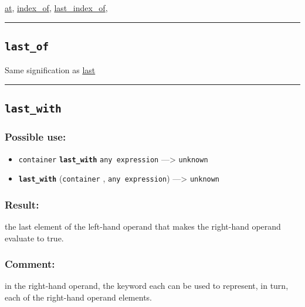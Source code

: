 \documentclass[]{book}
\providecommand{\tightlist}{%
  \setlength{\itemsep}{0pt}\setlength{\parskip}{0pt}}
\theoremstyle{definition}
\theoremstyle{definition}
\theoremstyle{definition}
\theoremstyle{remark}
\begin{document}
\href{OperatorsAA\#at}{at}, \href{OperatorsIM\#index_of}{index\_of},
\href{OperatorsIM\#last_index_of}{last\_index\_of},

\begin{center}\rule{0.5\linewidth}{\linethickness}\end{center}

\subsection{\texorpdfstring{\texttt{last\_of}}{last\_of}}\label{last_of}

Same signification as \href{OperatorsIM\#last}{last}

\begin{center}\rule{0.5\linewidth}{\linethickness}\end{center}

\subsection{\texorpdfstring{\texttt{last\_with}}{last\_with}}\label{last_with}

\subsubsection{Possible use:}\label{possible-use-318}

\begin{itemize}
\tightlist
\item
  \texttt{container} \textbf{\texttt{last\_with}}
  \texttt{any\ expression} ---\textgreater{} \texttt{unknown}
\item
  \textbf{\texttt{last\_with}} (\texttt{container} ,
  \texttt{any\ expression}) ---\textgreater{} \texttt{unknown}
\end{itemize}

\subsubsection{Result:}\label{result-308}

the last element of the left-hand operand that makes the right-hand
operand evaluate to true.

\subsubsection{Comment:}\label{comment-58}

in the right-hand operand, the keyword each can be used to represent, in
turn, each of the right-hand operand elements.
\end{document}
